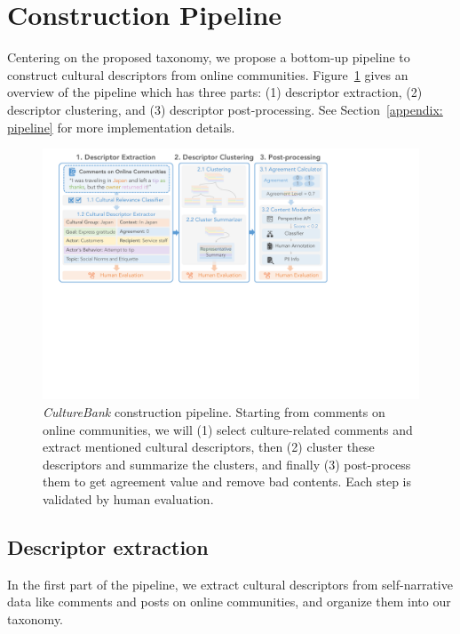 \documentclass{article} %
\newcommand{\dataname}{\textit{CultureBank}\xspace}
\begin{document}
\section{Construction Pipeline}
\label{sec:pipeline}
Centering on the proposed taxonomy, we propose a bottom-up pipeline to construct cultural descriptors from online communities. Figure~\ref{fig:construction_pipeline} gives an overview of the pipeline which has three parts: (1) descriptor extraction, (2) descriptor clustering, and (3) descriptor post-processing.  See Section~\ref{appendix: pipeline} for more implementation details. 
\begin{figure}[ht]
\centering
\includegraphics[width=\textwidth]{./img/framework_short.pdf}
\caption{\dataname construction pipeline. Starting from comments on online communities, we will (1) select culture-related comments and  extract mentioned cultural descriptors, then (2) cluster these descriptors and summarize the clusters, and finally (3) post-process them to get agreement value and remove bad contents. Each step is validated by human evaluation.}
\vspace{-1.5em}
\label{fig:construction_pipeline}
\end{figure}

\vspace{-1em}
\subsection{Descriptor extraction}
In the first part of the pipeline, we extract cultural descriptors from self-narrative data like comments and posts on online communities, and organize them into our taxonomy. 
\end{document}
